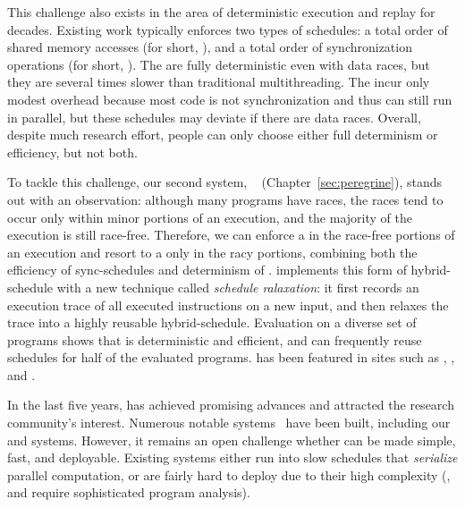  This challenge also exists in the area of deterministic
execution and replay for decades. Existing work typically enforces two types of
schedules: a total order of shared memory accesses (for short, \memsched), and a
total order of synchronization operations (for short, \syncsched). The
\memscheds are fully deterministic even with data races, but they are several
times slower than traditional multithreading. The \syncscheds incur only modest
overhead because most code is not synchronization and thus can still run in
parallel, but these schedules may deviate if there are data races. Overall,
despite much research effort, people can only choose either full determinism or
efficiency, but not both.

To tackle this challenge, our second \smt system,
\peregrine~\cite{peregrine:sosp11} (Chapter~\ref{sec:peregrine}), stands out
with an observation: although many programs have races, the races tend to occur
only within minor portions of an execution, and the majority of the execution is
still race-free. Therefore, we can enforce a \syncscheds in the race-free
portions of an execution and resort to a \memsched only in the racy portions,
combining both the efficiency of sync-schedules and determinism of \memscheds. 
\peregrine implements this form of hybrid-schedule with a new technique called
\emph{schedule ralaxation}: it first records an execution trace of
all executed instructions on a new input, and then relaxes the trace into a
highly reusable hybrid-schedule. Evaluation on a diverse set of programs shows
that \peregrine is deterministic and efficient, and can frequently reuse
schedules for half of the evaluated programs. \peregrine has been featured in
sites such as \acmtechnews, \tgdaily, and \physorg.

 In the last
five years, \smt has achieved promising advances and attracted the research
community's interest. Numerous notable \smt systems~\cite{determinator:osdi10,
cui:tern:osdi10, peregrine:sosp11, dthreads:sosp11, ics:oopsla13} have been
built, including our \tern and \peregrine systems. However, it remains an open
challenge whether \smt can be made simple, fast, and deployable. Existing \smt
systems either run into slow schedules that \emph{serialize} parallel
computation, or are fairly hard to deploy due to their high complexity (\eg,
\tern and \peregrine require sophisticated program analysis).

